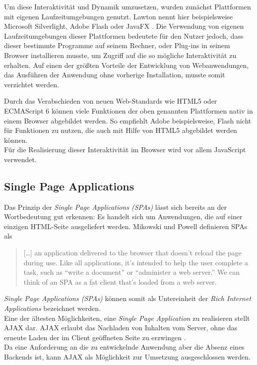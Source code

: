 Um diese Interaktivität und Dynamik umzusetzen, wurden zunächst Plattformen mit eigenen Laufzeitumgebungen genutzt. Lawton nennt hier beispielsweise Microsoft Silverlight, Adobe Flash oder JavaFX  \cite{lawton2008new}.
Die Verwendung von eigenen Laufzeitumgebungen dieser Plattformen  bedeutete für den Nutzer jedoch,  dass dieser bestimmte Programme auf seinem Rechner, oder Plug-ins in seinem Browser installieren musste, um Zugriff auf die so mögliche Interaktivität zu erhalten. Auf einen der größten Vorteile der Entwicklung von Webanwendungen, das Ausführen der Anwendung ohne vorherige Installation, musste somit verzichtet werden.

Durch das Verabschieden von neuen Web-Standards wie HTML5 oder ECMAScript 6 können viele Funktionen der oben genannten Plattformen nativ in einem Browser abgebildet werden. So empfiehlt Adobe beispielsweise, Flash nicht für Funktionen zu nutzen, die auch mit Hilfe von HTML5 abgebildet werden können\footnotemark{}.\\
Für die Realisierung dieser Interaktivität im Browser wird vor allem JavaScript verwendet.


\subsection{Single Page Applications}
Das Prinzip der \textit{Single Page Applications (SPAs)} lässt sich bereits an der Wortbedeutung gut erkennen: Es handelt sich um Anwendungen, die auf einer einzigen HTML-Seite ausgeliefert werden.
Mikowski und Powell definieren SPAs als

\begin{quote}
  […] an application delivered to the browser that doesn’t reload the page during use. Like all applications, it’s intended to help the user complete a task, such as “write a document” or “administer a web server.” We can think of an SPA as a fat client that’s loaded from a web server. \cite{MikowskiPowell201309}
\end{quote}

\textit{Single Page Applications (SPAs)} können somit als Untereinheit der \textit{Rich Internet Applications} bezeichnet werden.\\
Eine der ältesten Möglichkeiten, eine \textit{Single Page Application} zu realisieren stellt AJAX dar. AJAX erlaubt das Nachladen von Inhalten vom Server, ohne das erneute Laden der im Client geöffneten Seite zu erzwingen \cite{paulson2005building}.\\
Da eine Anforderung an die zu entwickelnde Anwendung aber die Absenz eines Backends ist, kann AJAX als Möglichkeit zur Umsetzung ausgeschlossen werden.

